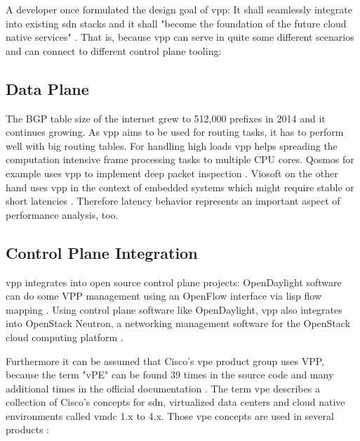 
A developer once formulated the design goal of \Ac{vpp}: It shall
seamlessly integrate into existing \Ac{sdn} stacks and it shall
"become the foundation of the future cloud native services"
\cite{florincoras}. That is, because \Ac{vpp} can serve in quite some
different scenarios and can connect to different control plane
tooling:

\subsection{Data Plane}


The BGP table size of the internet grew to 512,000 prefixes in 2014 and
it continues growing. As \Ac{vpp} aims to be used for routing tasks,
it has to perform well with big routing tables. \cite{bgphelp:size}
For handling high loads \Ac{vpp} helps spreading the computation
intensive frame processing tasks to multiple CPU cores. Qosmos for
example uses \Ac{vpp} to implement deep packet inspection
\cite{qosmos}. Viosoft on the other hand uses \Ac{vpp} in the context
of embedded systems which might require stable or short latencies
\cite{viosoft}. Therefore latency behavior represents an important
aspect of performance analysis, too.


\subsection{Control Plane Integration}

\Ac{vpp} integrates into open source control plane projects:
OpenDaylight software can do some VPP management using an OpenFlow
interface via \Ac{lisp} flow mapping \cite{opendaylight:lisp}. Using
control plane software like OpenDaylight, \Ac{vpp} also integrates
into OpenStack Neutron, a networking management software for the
OpenStack cloud computing platform \cite{fdio:integration}.



Furthermore it can be assumed that Cisco's \Ac{vpe} product group uses
VPP, because the term "vPE" can be found 39 times in the source code
and many additional times in the official documentation
\cite{vppdocs}. \newpage
The term \Ac{vpe} describes a collection of Cisco's concepts for
\Ac{sdn}, virtualized data centers and cloud native environments
called \Ac{vmdc} 1.x to 4.x. Those \Ac{vpe} concepts are used in
several products \cite{cisco:sdn}:

